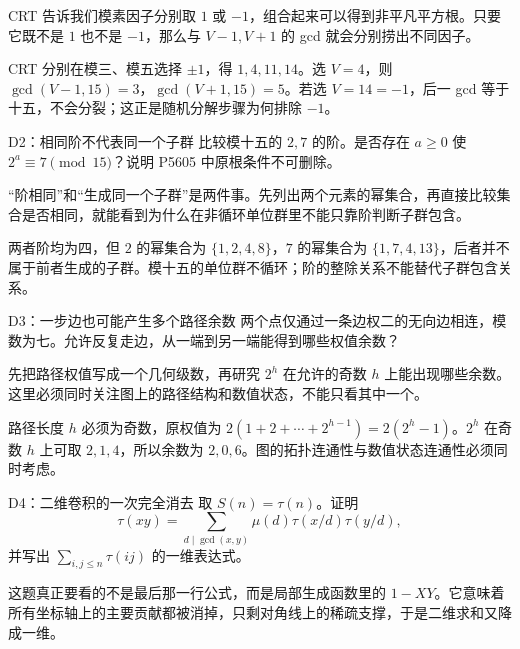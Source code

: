 \begin{pitfall}[讲解：先看这题到底在做什么]
CRT 告诉我们模素因子分别取 $1$ 或 $-1$，组合起来可以得到非平凡平方根。只要它既不是 $1$ 也不是 $-1$，那么与 $V-1,V+1$ 的 gcd 就会分别捞出不同因子。
\end{pitfall}

\sol CRT 分别在模三、模五选择 $\pm1$，得 $1,4,11,14$。选 $V=4$，则 $\gcd(V-1,15)=3$，$\gcd(V+1,15)=5$。若选 $V=14=-1$，后一 gcd 等于十五，不会分裂；这正是随机分解步骤为何排除 $-1$。


\begin{problem}{D2：相同阶不代表同一个子群}
比较模十五的 $2,7$ 的阶。是否存在 $a\ge0$ 使 $2^a\equiv7\pmod{15}$？说明 P5605 中原根条件不可删除。
\end{problem}

\begin{pitfall}[讲解：先看这题到底在做什么]
“阶相同”和“生成同一个子群”是两件事。先列出两个元素的幂集合，再直接比较集合是否相同，就能看到为什么在非循环单位群里不能只靠阶判断子群包含。
\end{pitfall}

\sol 两者阶均为四，但 $2$ 的幂集合为 $\{1,2,4,8\}$，$7$ 的幂集合为 $\{1,7,4,13\}$，后者并不属于前者生成的子群。模十五的单位群不循环；阶的整除关系不能替代子群包含关系。


\begin{problem}{D3：一步边也可能产生多个路径余数}
两个点仅通过一条边权二的无向边相连，模数为七。允许反复走边，从一端到另一端能得到哪些权值余数？
\end{problem}

\begin{pitfall}[讲解：先看这题到底在做什么]
先把路径权值写成一个几何级数，再研究 $2^h$ 在允许的奇数 $h$ 上能出现哪些余数。这里必须同时关注图上的路径结构和数值状态，不能只看其中一个。
\end{pitfall}

\sol 路径长度 $h$ 必须为奇数，原权值为 $2(1+2+\cdots+2^{h-1})=2(2^h-1)$。$2^h$ 在奇数 $h$ 上可取 $2,1,4$，所以余数为 $2,0,6$。图的拓扑连通性与数值状态连通性必须同时考虑。


\begin{problem}{D4：二维卷积的一次完全消去}
取 $S(n)=\tau(n)$。证明
\[
 \tau(xy)=\sum_{d\mid\gcd(x,y)}\mu(d)\tau(x/d)\tau(y/d),
\]
并写出 $\sum_{i,j\le n}\tau(ij)$ 的一维表达式。
\end{problem}

\begin{pitfall}[讲解：先看这题到底在做什么]
这题真正要看的不是最后那一行公式，而是局部生成函数里的 $1-XY$。它意味着所有坐标轴上的主要贡献都被消掉，只剩对角线上的稀疏支撑，于是二维求和又降成一维。
\end{pitfall}

